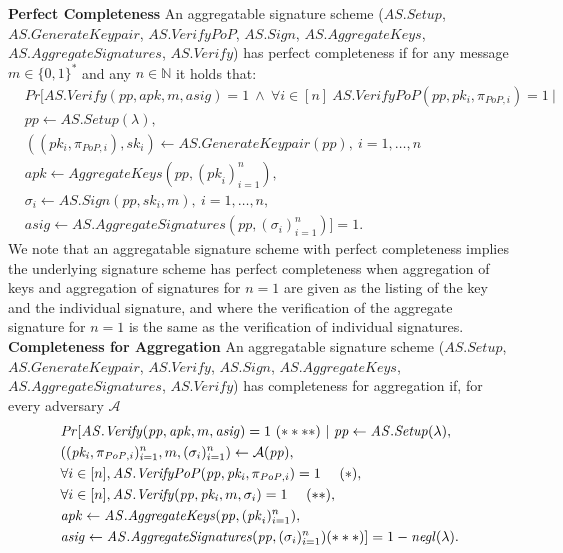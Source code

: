 \noindent \textbf{Perfect Completeness} An aggregatable signature scheme
($\mathit{AS.Setup}$, \\ $\mathit{AS.GenerateKeypair}$, $\mathit{AS.VerifyPoP}$, $\mathit{AS.Sign}$, $\mathit{AS.AggregateKeys}$,\\ 
$\mathit{AS.AggregateSignatures}$, $\mathit{AS.Verify}$) has perfect completeness if for any message $m \in \{0,1\}^*$ and any 
$n\in\mathbb{N}$ it holds that:
\begin{align*}
& \mathit{Pr} [\mathit{AS.Verify}(\mathit{pp}, \mathit{apk}, m, \mathit{asig})=1 \ \wedge \ \forall  i \in [n]\ \mathit{AS.VerifyPoP}(\mathit{pp}, \mathit{pk_i},\mathit{\pi_{\mathit{PoP},i}})=1\ |\\
& \mathit{pp} \leftarrow \mathit{AS.Setup(\lambda)}, \\
& ((pk_{i},\pi_{\mathit{PoP}, i}), sk_{i} ) \leftarrow \mathit{AS.GenerateKeypair}(\mathit{pp}),\ i=1,\ldots,n\\
&\mathit{apk} \leftarrow \mathit{AggregateKeys}(\mathit{pp}, (\mathit{pk}_{i})_{i=1}^{n}), \\
& \sigma_i \leftarrow \mathit{AS.Sign}(\mathit{pp}, \mathit{sk_i}, m),\ i=1,\ldots,n, \\
& \mathit{asig} \leftarrow \mathit{AS.AggregateSignatures(\mathit{pp}, (\sigma_{i})_{i=1}^{n})}] = 1.
\end{align*}
\noindent We note that an aggregatable signature scheme with perfect completeness implies the underlying signature scheme
has perfect completeness when aggregation of keys and aggregation of signatures for $n=1$ are given as the listing of the key and 
the individual signature, and where the verification of the aggregate signature for $n=1$ is the same as the verification of individual signatures. \\

\noindent \textbf{Completeness for Aggregation} An aggregatable signature scheme 
($\mathit{AS.Setup}$, $\mathit{AS.GenerateKeypair}$, $\mathit{AS.Verify}$, $\mathit{AS.Sign}$,
$\mathit{AS.AggregateKeys}$, $\mathit{AS.AggregateSignatures}$, $\mathit{AS.Verify}$)
has completeness for aggregation if, for every adversary $\mathcal{A}$
\begin{align*}
&\mathit{Pr}[\mathit{AS.Verify}(\mathit{pp}, \mathit{apk}, m, \mathit{asig}) = 1 \ (\ast\ast\ast\ast) \ | \ \mathit{pp} \leftarrow \mathit{AS.Setup}(\lambda), \\
& ((\mathit{pk_i}, \pi_{\mathit{PoP},i})_{i=1}^n, m, (\sigma_i)_{i=1}^{n}) \leftarrow \mathcal{A}(\mathit{\mathit{pp})}, \\
& \forall i \in [n], \mathit{AS.VerifyPoP}(\mathit{pp}, \mathit{pk_i}, \pi_{\mathit{PoP},i}) = 1 \ \ \ \ (\ast), \\
& \forall i \in [n], \mathit{AS.Verify}(\mathit{pp}, \mathit{pk_i}, m, \sigma_i) = 1 \ \ \ \ (\ast\ast),\\
& \mathit{apk} \leftarrow \mathit{AS.AggregateKeys}(\mathit{pp},  (\mathit{pk}_{i})_{i=1}^{n}), \\
&  \mathit{asig} \leftarrow \mathit{AS.AggregateSignatures}(\mathit{pp}, (\sigma_i)_{i=1}^n) (\ast\ast\ast)] = 1- \mathit{negl}(\lambda).
\end{align*}

